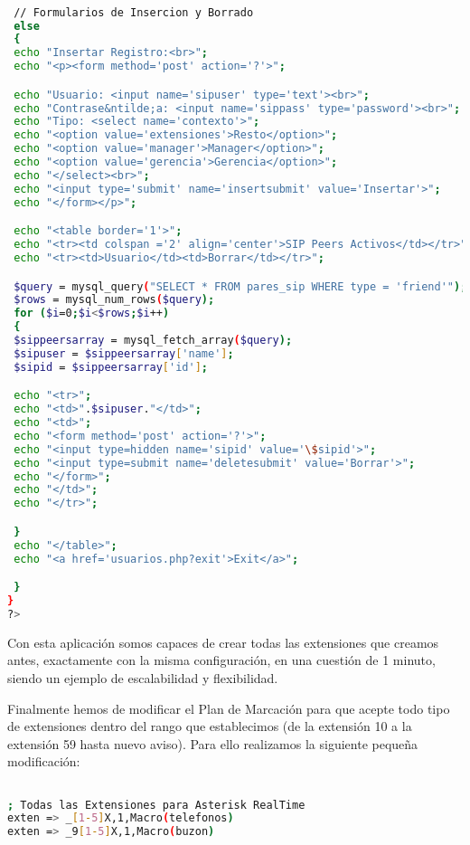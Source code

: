 \begin{lstlisting}[language=bash,title={./www/usuarios.php}]

 // Formularios de Insercion y Borrado
 else
 {
 echo "Insertar Registro:<br>";
 echo "<p><form method='post' action='?'>";

 echo "Usuario: <input name='sipuser' type='text'><br>";
 echo "Contrase&ntilde;a: <input name='sippass' type='password'><br>";
 echo "Tipo: <select name='contexto'>";
 echo "<option value='extensiones'>Resto</option>";
 echo "<option value='manager'>Manager</option>";
 echo "<option value='gerencia'>Gerencia</option>";
 echo "</select><br>";
 echo "<input type='submit' name='insertsubmit' value='Insertar'>";
 echo "</form></p>";

 echo "<table border='1'>";
 echo "<tr><td colspan ='2' align='center'>SIP Peers Activos</td></tr>";
 echo "<tr><td>Usuario</td><td>Borrar</td></tr>";

 $query = mysql_query("SELECT * FROM pares_sip WHERE type = 'friend'");
 $rows = mysql_num_rows($query);
 for ($i=0;$i<$rows;$i++)
 {
 $sippeersarray = mysql_fetch_array($query);
 $sipuser = $sippeersarray['name'];
 $sipid = $sippeersarray['id'];

 echo "<tr>";
 echo "<td>".$sipuser."</td>";
 echo "<td>";
 echo "<form method='post' action='?'>";
 echo "<input type=hidden name='sipid' value='\$sipid'>";
 echo "<input type=submit name='deletesubmit' value='Borrar'>";
 echo "</form>";
 echo "</td>";
 echo "</tr>";

 }
 echo "</table>";
 echo "<a href='usuarios.php?exit'>Exit</a>";

 }
}
?>

\end{lstlisting}

Con esta aplicación somos capaces de crear todas las extensiones que creamos antes, exactamente con la misma configuración, en una cuestión de 1 minuto, siendo un ejemplo de escalabilidad y flexibilidad.

Finalmente hemos de modificar el Plan de Marcación para que acepte todo tipo de extensiones dentro del rango que establecimos (de la extensión 10 a la extensión 59 hasta nuevo aviso). Para ello realizamos la siguiente pequeña modificación:

\begin{lstlisting}[language=bash,title={/etc/asterisk/extensions.conf}]

; Todas las Extensiones para Asterisk RealTime
exten => _[1-5]X,1,Macro(telefonos)
exten => _9[1-5]X,1,Macro(buzon)

\end{lstlisting}

